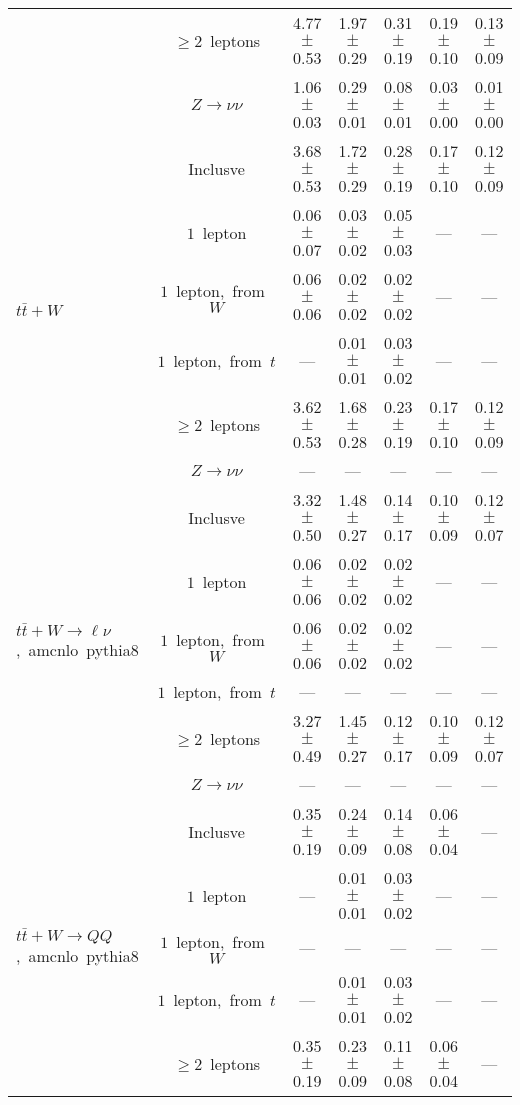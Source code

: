 \documentclass{article}
\begin{document}
\begin{longtable}{|l|c|c|c|c|c|c|}
 & $\ge2$~leptons  & 4.77 $\pm$ 0.53  & 1.97 $\pm$ 0.29  & 0.31 $\pm$ 0.19  & 0.19 $\pm$ 0.10  & 0.13 $\pm$ 0.09 \\* 
 & $Z\rightarrow\nu\nu$  & 1.06 $\pm$ 0.03  & 0.29 $\pm$ 0.01  & 0.08 $\pm$ 0.01  & 0.03 $\pm$ 0.00  & 0.01 $\pm$ 0.00 \\* 
\hline 
\multirow{6}{*}{$t\bar{t}+W$} & Inclusve  & 3.68 $\pm$ 0.53  & 1.72 $\pm$ 0.29  & 0.28 $\pm$ 0.19  & 0.17 $\pm$ 0.10  & 0.12 $\pm$ 0.09 \\* 
 & $1$~lepton  & 0.06 $\pm$ 0.07  & 0.03 $\pm$ 0.02  & 0.05 $\pm$ 0.03  & ---  & --- \\* 
 & $1$~lepton,~from~$W$  & 0.06 $\pm$ 0.06  & 0.02 $\pm$ 0.02  & 0.02 $\pm$ 0.02  & ---  & --- \\* 
 & $1$~lepton,~from~$t$  & ---  & 0.01 $\pm$ 0.01  & 0.03 $\pm$ 0.02  & ---  & --- \\* 
 & $\ge2$~leptons  & 3.62 $\pm$ 0.53  & 1.68 $\pm$ 0.28  & 0.23 $\pm$ 0.19  & 0.17 $\pm$ 0.10  & 0.12 $\pm$ 0.09 \\* 
 & $Z\rightarrow\nu\nu$  & ---  & ---  & ---  & ---  & --- \\* 
\hline 
\multirow{6}{*}{$t\bar{t}+W{\rightarrow}{\ell}{\nu}$,~amcnlo~pythia8} & Inclusve  & 3.32 $\pm$ 0.50  & 1.48 $\pm$ 0.27  & 0.14 $\pm$ 0.17  & 0.10 $\pm$ 0.09  & 0.12 $\pm$ 0.07 \\* 
 & $1$~lepton  & 0.06 $\pm$ 0.06  & 0.02 $\pm$ 0.02  & 0.02 $\pm$ 0.02  & ---  & --- \\* 
 & $1$~lepton,~from~$W$  & 0.06 $\pm$ 0.06  & 0.02 $\pm$ 0.02  & 0.02 $\pm$ 0.02  & ---  & --- \\* 
 & $1$~lepton,~from~$t$  & ---  & ---  & ---  & ---  & --- \\* 
 & $\ge2$~leptons  & 3.27 $\pm$ 0.49  & 1.45 $\pm$ 0.27  & 0.12 $\pm$ 0.17  & 0.10 $\pm$ 0.09  & 0.12 $\pm$ 0.07 \\* 
 & $Z\rightarrow\nu\nu$  & ---  & ---  & ---  & ---  & --- \\* 
\hline 
\multirow{6}{*}{$t\bar{t}+W{\rightarrow}QQ$,~amcnlo~pythia8} & Inclusve  & 0.35 $\pm$ 0.19  & 0.24 $\pm$ 0.09  & 0.14 $\pm$ 0.08  & 0.06 $\pm$ 0.04  & --- \\* 
 & $1$~lepton  & ---  & 0.01 $\pm$ 0.01  & 0.03 $\pm$ 0.02  & ---  & --- \\* 
 & $1$~lepton,~from~$W$  & ---  & ---  & ---  & ---  & --- \\* 
 & $1$~lepton,~from~$t$  & ---  & 0.01 $\pm$ 0.01  & 0.03 $\pm$ 0.02  & ---  & --- \\* 
 & $\ge2$~leptons  & 0.35 $\pm$ 0.19  & 0.23 $\pm$ 0.09  & 0.11 $\pm$ 0.08  & 0.06 $\pm$ 0.04  & --- \\* 

\end{longtable}
\end{document}
